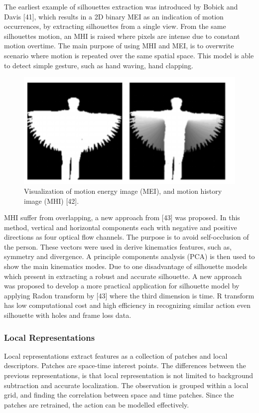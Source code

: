 The earliest example of silhouettes extraction was introduced by Bobick and Davis [41], which results in a 2D binary MEI as an indication of motion occurrences, by extracting silhouettes from a single view. From the same silhouettes motion, an MHI is raised where pixels are intense due to constant motion overtime. The main purpose of using MHI and MEI, is to overwrite scenario where motion is repeated over the same spatial space. This model is able to detect simple gesture, such as hand waving, hand clapping.   
\begin{figure}[ht]
\centering
\includegraphics{Figures/hg}
\decoRule
\caption[Visualization of motion energy image (MEI), and motion history image (MHI) "42"]{Visualization of motion energy image (MEI), and motion history image (MHI) [42].}
\label{fig:la1}
\end{figure}
MHI suffer from overlapping, a new approach from [43] was proposed. In this method, vertical and horizontal components each with negative and positive directions as four optical flow channels. The purpose is to avoid self-occlusion of the person. These vectors were used in derive kinematics features, such as, symmetry and divergence. A principle components analysis (PCA) is then used to show the main kinematics modes. Due to one disadvantage of silhouette models which present in extracting a robust and accurate silhouette. A new approach was proposed to develop a more practical application for silhouette model by applying Radon transform by [43] where the third dimension is time. R transform has low computational cost and high efficiency in recognizing similar action even silhouette with holes and frame loss data. 


\subsubsection{Local Representations}
\hspace{5mm} Local representations extract features as a collection of patches and local descriptors. Patches are space-time interest points. The differences between the previous representations, is that local representation is not limited to background subtraction and accurate localization. The observation is grouped within a local grid, and finding the correlation between space and time patches. Since the patches are retrained, the action can be modelled effectively.\\

